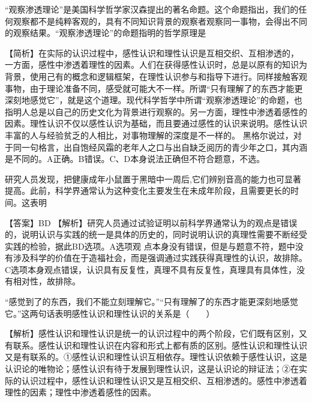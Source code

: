 \question ``观察渗透理论''是美国科学哲学家汉森提出的著名命题。这个命题指出，我们的任何观察都不是纯粹客观的，具有不同知识背景的观察者观察同一事物，会得出不同的观察结果。``观察渗透理论''的命题指明的哲学原理是
\par{}
\begin{solution}【简析】在实际的认识过程中，感性认识和理性认识是互相交织、互相渗透的，
一方面，感性中渗透着理性的因素。人们在获得感性认识时，总是以原有的知识为背景，使用己有的概念和逻辑框架，在理性认识参与和指导下进行。同样接触客观事物，由于理论准备不同，感受就可能大不一样。所谓``只有理解了的东西才能更深刻地感觉它''，就是这个道理。现代科学哲学中所谓``观察渗透理论''的命题，也指明人总是以自己的历史文化为背景进行观察的。另一方面，理性中渗透着感性的因素。理性认识不仅以感性认识为基础，而且要通过感性的认识来说明。感性认识丰富的人与经验贫乏的人相比，对事物理解的深度是不一样的。
黑格尔说过，对于同一句格言，出自饱经风霜的老年人之口与出自缺乏阅历的青少年之口，其内涵是不同的。A正确。B错误。C、D本身说法正确但不符合题意，不选。
\end{solution}
\question 研究人员发现，把健康成年小鼠置于黑暗中一周后,它们辨别音高的能力也可显著提高。此前，科学界通常认为这种变化主要发生在未成年阶段，且需要更长的时间。这表明
\par{}
\begin{solution}【答案】BD
【解析】研究人员通过试验证明以前科学界通常认为的观点是错误的，说明认识与实践的统一是具体的历史的，同时说明认识的真理性需要不断经受实践的检验，据此BD选项。A选项观
点本身没有错误，但是与题意不符，题中没有涉及科学的价值在于造福社会，而是强调通过实践获得真理性的认识，故排除。C选项本身观点错误，认识具有反复性，真理不具有反复性，真理具有具体性，没有相对性，故排除。
\end{solution}
\question ``感觉到了的东西，我们不能立刻理解它。''``只有理解了的东西才能更深刻地感觉它。''这两句话表明感性认识和理性认识的关系是（　　）
\par\fourch{\textcolor{red}{感性认识和理性认识在内容上有质的区别}}{\textcolor{red}{感性中渗透着理性的因素}}{\textcolor{red}{理性中渗透着感性的认识}}{\textcolor{red}{理性认识不仅以感性认识为基础，而且要用感性的认识来说明}}
\begin{solution}【解析】感性认识和理性认识是统一的认识过程中的两个阶段，它们既有区别，又有联系。感性认识和理性认识在内容和形式上都有质的区别。感性认识和理性认识又是有联系的。①感性认识和理性认识互相依存。理性认识依赖于感性认识，这是认识论的唯物论；感性认识有待于发展到理性认识，这是认识论的辩证法；②在实际的认识过程中，感性认识和理性认识又是互相交织、互相渗透的。感性中渗透着理性的因素；理性中渗透着感性的因素。
\end{solution}
